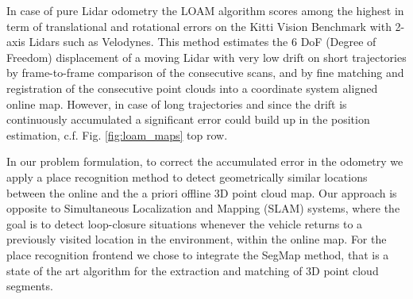 \documentclass[letterpaper, 10 pt, conference]{ieeeconf}  %
\begin{document}
In case of pure Lidar odometry the LOAM \cite{loam} algorithm scores among the highest in term of translational and rotational errors on the Kitti Vision Benchmark \cite{kitti} with 2-axis Lidars such as Velodynes.
This method estimates the 6 DoF (Degree of Freedom) displacement of a moving Lidar with very low drift on short trajectories by frame-to-frame comparison of the consecutive scans, and by fine matching and registration of the consecutive point clouds into a coordinate system aligned online map. 
However, in case of long trajectories and since the drift is continuously accumulated a significant error could build up in the position estimation, c.f. Fig. \ref{fig:loam_maps} top row.

In our problem formulation, to correct the accumulated error in the odometry we apply a place recognition method to detect geometrically similar locations between the online and the a priori offline 3D point cloud map. Our approach is opposite to Simultaneous Localization and Mapping (SLAM) systems, where the goal is to detect loop-closure situations whenever the vehicle returns to a previously visited location in the environment, within the online map. For the place recognition frontend we chose to integrate the SegMap \cite{segmap} method, that is a state of the art algorithm for the extraction and matching of 3D point cloud segments. 
\end{document}
